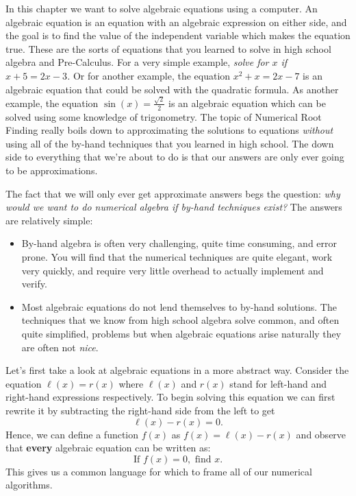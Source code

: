 \documentclass[
]{book}
\providecommand{\tightlist}{%
  \setlength{\itemsep}{0pt}\setlength{\parskip}{0pt}}
\theoremstyle{definition}
\theoremstyle{definition}
\theoremstyle{definition}
\theoremstyle{remark}
\begin{document}
In this chapter we want to solve algebraic equations using a computer. An algebraic equation is an equation with an algebraic expression on either side, and the goal is to find the value of the independent variable which makes the equation true. These are the sorts of equations that you learned to solve in high school algebra and Pre-Calculus. For a very simple example, \emph{solve for \(x\) if \(x+5 = 2x- 3\).} Or for another example, the equation \(x^2+x=2x - 7\) is an algebraic equation that could be solved with the quadratic formula. As another example, the equation \(\sin(x) = \frac{\sqrt{2}}{2}\) is an algebraic equation which can be solved using some knowledge of trigonometry. The topic of Numerical Root Finding really boils down to approximating the solutions to equations \emph{without} using all of the by-hand techniques that you learned in high school. The down side to everything that we're about to do is that our answers are only ever going to be approximations.

The fact that we will only ever get approximate answers begs the question: \emph{why would we want to do numerical algebra if by-hand techniques exist?} The answers are relatively simple:

\begin{itemize}
\tightlist
\item
  By-hand algebra is often very challenging, quite time consuming, and error prone. You will find that the numerical techniques are quite elegant, work very quickly, and require very little overhead to actually implement and verify.\\
\item
  Most algebraic equations do not lend themselves to by-hand solutions. The techniques that we know from high school algebra solve common, and often quite simplified, problems but when algebraic equations arise naturally they are often not \emph{nice}.
\end{itemize}

Let's first take a look at algebraic equations in a more abstract way. Consider the equation \(\ell(x) = r(x)\) where \(\ell(x)\) and \(r(x)\) stand for
left-hand and right-hand expressions respectively. To begin solving this equation we can first rewrite it by subtracting the right-hand side from the left to get
\[ \ell(x) - r(x) = 0.\]
Hence, we can define a function \(f(x)\) as \(f(x)=\ell(x)-r(x)\) and observe that \textbf{every} algebraic equation can be written as:
\[ \text{If } f(x) = 0, \text{ find } x. \]
This gives us a common language for which to frame all of our numerical algorithms.
\end{document}
